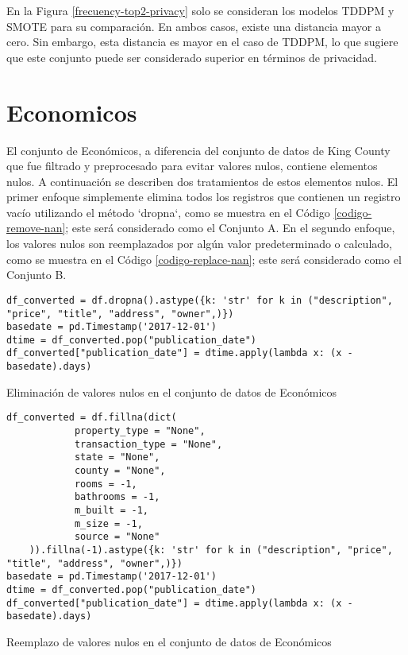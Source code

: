 En la Figura \ref{frecuency-top2-privacy} solo se consideran los modelos TDDPM y SMOTE para su comparación. En ambos casos, existe una distancia mayor a cero. Sin embargo, esta distancia es mayor en el caso de TDDPM, lo que sugiere que este conjunto puede ser considerado superior en términos de privacidad.





\newpage
\section{Economicos}
El conjunto de Económicos, a diferencia del conjunto de datos de King County que fue filtrado y preprocesado para evitar valores nulos, contiene elementos nulos. A continuación se describen dos tratamientos de estos elementos nulos. El primer enfoque simplemente elimina todos los registros que contienen un registro vacío utilizando el método `dropna`, como se muestra en el Código \ref{codigo-remove-nan}; este será considerado como el Conjunto A. En el segundo enfoque, los valores nulos son reemplazados por algún valor predeterminado o calculado, como se muestra en el Código \ref{codigo-replace-nan}; este será considerado como el Conjunto B.

\begin{listing}[H]
    \begin{verbatim}
df_converted = df.dropna().astype({k: 'str' for k in ("description", "price", "title", "address", "owner",)})
basedate = pd.Timestamp('2017-12-01')
dtime = df_converted.pop("publication_date")
df_converted["publication_date"] = dtime.apply(lambda x: (x - basedate).days)
    \end{verbatim}
\caption{Eliminación de valores nulos en el conjunto de datos de Económicos}
\label{codigo-remove-nan}
\end{listing}

\begin{listing}[H]
    \begin{verbatim}
df_converted = df.fillna(dict(
            property_type = "None",
            transaction_type = "None",
            state = "None",
            county = "None",
            rooms = -1,
            bathrooms = -1,
            m_built = -1,
            m_size = -1,
            source = "None"
    )).fillna(-1).astype({k: 'str' for k in ("description", "price", "title", "address", "owner",)})
basedate = pd.Timestamp('2017-12-01')
dtime = df_converted.pop("publication_date")
df_converted["publication_date"] = dtime.apply(lambda x: (x - basedate).days)
    \end{verbatim}
\caption{Reemplazo de valores nulos en el conjunto de datos de Económicos}
\label{codigo-replace-nan}
\end{listing}

